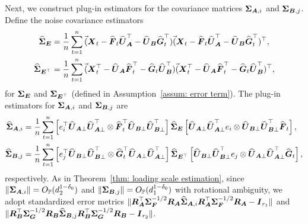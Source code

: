 \documentclass[11pt,letterpaper]{article}
\theoremstyle{definition}
\begin{document}
Next, we construct plug-in estimators for the covariance matrices $\bSigma_{\bA,i}$ and $\bSigma_{\bB,j}$. %
Define the noise covariance estimators
\begin{align}
\widehat{\bSigma}_{\bE} &= \frac{1}{n} \sum_{t=1}^n \Vec (\bX_t - \widehat{\bF}_t \widehat{\bU}_{\bA}^{\top} - \widehat{\bU}_{\bB} \widehat{\bG}_t^{\top}) \Vec (\bX_t - \widehat{\bF}_t \widehat{\bU}_{\bA}^{\top} - \widehat{\bU}_{\bB} \widehat{\bG}_t^{\top})^{\top}  ,\label{eqn: Sigma_hat_E}\\
\widehat{\bSigma}_{\bE^{\top}} &= \frac{1}{n} \sum_{t=1}^n \Vec (\bX_t^{\top} - \widehat{\bU}_{\bA}\widehat{\bF}_t^{\top} - \widehat{\bG}_t\widehat{\bU}_{\bB}^{\top}) \Vec (\bX_t^{\top} - \widehat{\bU}_{\bA}\widehat{\bF}_t ^{\top} - \widehat{\bG}_t\widehat{\bU}_{\bB}^{\top})^{\top},  \label{eqn: Sigma_hat_Et}
\end{align}
for $\bSigma_{\bE}$ and $\bSigma_{\bE^{\top}}$ (defined in Assumption~\ref{assum: error term}). The plug-in estimators for $\bSigma_{\bA,i}$ and $\bSigma_{\bB,j}$ are
\begin{align}
\widehat{\bSigma}_{\bA,i} &= \frac{1}{n}\sum_{t=1}^n\left[e_i^{\top}\widehat{\bU}_{\bA\perp}\widehat{\bU}_{\bA\perp}^{\top} \otimes \widehat{\bF}_t^{\top} \widehat{\bU}_{\bB \perp}\widehat{\bU}_{\bB \perp}^{\top}\right] \widehat{\bSigma}_{\bE} \left[\widehat{\bU}_{\bA\perp}\widehat{\bU}_{\bA\perp}^{\top} e_i \otimes \widehat{\bU}_{\bB\perp} \widehat{\bU}_{\bB\perp}^{\top} \widehat{\bF}_t \right], \label{eqn: Sigma_hat_A}\\ 
\widehat{\bSigma}_{\bB,j} &= \frac{1}{n}\sum_{t=1}^n\left[e_j^{\top}\widehat{\bU}_{\bB\perp}\widehat{\bU}_{\bB\perp}^{\top} \otimes \widehat{\bG}_t^{\top} \widehat{\bU}_{\bA \perp}\widehat{\bU}_{\bA \perp}^{\top}\right] \widehat \bSigma_{\bE^{\top}} \left[\widehat{\bU}_{\bB\perp}\widehat{\bU}_{\bB\perp}^{\top}e_j \otimes \widehat{\bU}_{\bA \perp} \widehat{\bU}_{\bA \perp}^{\top} \widehat{\bG}_t\right], \label{eqn: Sigma_hat_B}
\end{align}
respectively. As in Theorem~\ref{thm: loading scale estimation}, since $\|\bSigma_{\bA,i}\| = O_{\PP}(d_2^{1-\delta_0})$ and $\|\bSigma_{\bB,j}\| = O_{\PP}(d_1^{1-\delta_0})$ with rotational ambiguity, we adopt standardized error metrics $\|\bR_{\bA}^{\top}\bSigma_{\bF}^{-1/2}\bR_{\bA}\widehat{\bSigma}_{\bA,i}\bR_{\bA}^{\top}\bSigma_{\bF}^{-1/2}\bR_{\bA} - \bI_{r_1}\|$ and $\|\bR_{\bB}^{\top}\bSigma_{\bG}^{-1/2}\bR_{\bB}\widehat{\bSigma}_{\bB,j}\bR_{\bB}^{\top}\bSigma_{\bG}^{-1/2}\bR_{\bB} - \bI_{r_2}\|$. 
\end{document}
